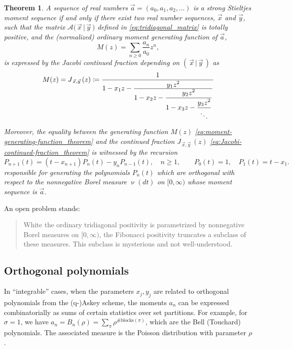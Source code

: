 \documentclass[letterpaper,11pt,oneside,reqno]{article}
\numberwithin{equation}{section}
\newtheorem{theorem}[proposition]{Theorem}
\theoremstyle{definition}
\begin{document}
\begin{theorem}
\label{thm:stieltjes-moments-theorem}
A sequence of real numbers $\vec{a} = (a_0, a_1, a_2, \dots)$ is a strong Stieltjes moment sequence if and only if there exist two real number sequences, $\vec{x}$ and $\vec{y}$, such that the matrix $\mathcal{A} \big( \, \vec{x} \, | \, \vec{y} \, \big)$ defined in \eqref{eq:tridiagonal_matrix} is totally positive, and the (normalized) ordinary moment generating function of $\vec a$,
\begin{equation}
	\label{eq:moment-generating-function_theorem}
	M(z) = \sum_{n \geq 0} \frac{a_n}{a_0} z^n,
\end{equation}
is expressed by the Jacobi continued fraction
depending on $( \, \vec{x} \, | \, \vec{y} \, )$ as
\begin{equation}
	\label{eq:Jacobi-continued-fraction_theorem}
	M(z)=
	J_{\, \vec{x}, \vec{y}} \,(z) \coloneqq
{1 \over {1 - x_1z - {\displaystyle y_1z^2 \over {\displaystyle 1 - x_2 z - {\displaystyle y_2z^2 \over
{\displaystyle 1 - x_3 z - {\displaystyle y_3z^2 \over {\ddots } } } } } } } }
\end{equation}

Moreover,
the equality between the
generating function $M(z)$ \eqref{eq:moment-generating-function_theorem}
and the continued fraction
$J_{\, \vec{x}, \vec{y}} \,(z)$ \eqref{eq:Jacobi-continued-fraction_theorem}
is witnessed by the recursion
\begin{equation*}
	P_{n+1}(t) = (t - x_{n+1})P_n(t) - y_n P_{n-1}(t),
	\quad n \geq 1,
	\qquad
	P_0(t) = 1, \quad P_1(t) = t - x_1.
\end{equation*}
responsible for generating the polynomials
$P_n(t)$ which are orthogonal with respect to the nonnegative
Borel measure $\upnu(dt)$
on $[0,\infty)$ whose moment sequence is
$\vec{a}$.
\end{theorem}

An open problem stands:
\begin{quote}
	White the ordinary tridiagonal positivity is parametrized by
	nonnegative
	Borel measures on $[0,\infty)$, the Fibonacci positivity
	truncates a subclass of these measures. This
	subclass is mysterious and not well-understood.
\end{quote}

\subsection{Orthogonal polynomials}

In ``integrable'' cases, when the
parameters $x_j,y_j$ are related to orthogonal polynomials
from the (q-)Askey scheme,
the moments $a_n$ can be expressed combinatorially
as sums of certain statistics over set partitions.
For example, for $\sigma=1$, we have
$a_n=B_n(\rho)=\sum_\pi \rho^{\#\text{blocks}(\pi)}$,
which are the Bell (Touchard) polynomials.
The associated measure is the Poisson distribution
with parameter $\rho$.
\end{document}
